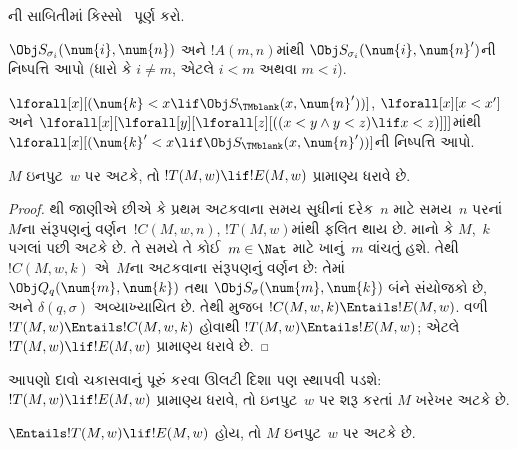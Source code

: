\begin{prob}
ની સાબિતીમાં
કિસ્સો~ પૂર્ણ કરો.
\end{prob}

\begin{prob}
$\Obj S_{\sigma_i}(\num{i}, \num{n})$ અને
$!A(m, n)$માંથી
$\Obj S_{\sigma_i}(\num{i}, \num{n}')$ની
નિષ્પત્તિ આપો (ધારો કે $i \neq m$,
એટલે $i < m$ અથવા $m < i$).
\end{prob}

\begin{prob}
$\lforall[x][(\num{k} < x \lif \Obj
  S_\TMblank(x, \num{n}'))]$,
$\lforall[x][x < x']$ અને
$\lforall[x][\lforall[y][\lforall[z][ ((x < y \land y < z) \lif x <
      z)]]]$માંથી
$\lforall[x][(\num{k}' < x \lif \Obj
  S_\TMblank(x, \num{n}'))]$ની
નિષ્પત્તિ આપો.
\end{prob}

\begin{lem}
$M$ ઇનપુટ~$w$ પર અટકે, તો
$!T(M, w) \lif !E(M, w)$ પ્રામાણ્ય ધરાવે છે.
\end{lem}

\begin{proof}
થી જાણીએ છીએ કે પ્રથમ
અટકવાના સમય સુધીનાં દરેક~$n$ માટે
સમય~$n$ પરનાં~$M$ના સંરૂપણનું
વર્ણન~$!C(M, w, n)$,
$!T(M, w)$માંથી ફલિત થાય છે.
માનો કે $M$,~$k$ પગલાં પછી અટકે છે. તે સમયે
તે કોઈ~$m \in \Nat$ માટે ખાનું~$m$ વાંચતું હશે.
તેથી $!C(M, w, k)$ એ~$M$ના અટકવાના
સંરૂપણનું વર્ણન છે: તેમાં
$\Obj Q_q(\num{m}, \num{k})$ તથા
$\Obj S_\sigma(\num{m}, \num{k})$ બંને સંયોજકો છે,
અને $\delta(q,\sigma)$ અવ્યાખ્યાયિત છે. તેથી
 મુજબ
$!C(M, w, k) \Entails !E(M, w)$. વળી
$!T(M, w) \Entails !C(M, w, k)$ હોવાથી
$!T(M, w) \Entails !E(M, w)$; એટલે
$!T(M, w) \lif !E(M, w)$ પ્રામાણ્ય ધરાવે છે.
\end{proof}

\begin{explain}
આપણો દાવો ચકાસવાનું પૂરું કરવા ઊલટી દિશા પણ
સ્થાપવી પડશે: $!T(M, w) \lif !E(M, w)$
પ્રામાણ્ય ધરાવે, તો ઇનપુટ~$w$ પર શરૂ કરતાં
$M$ ખરેખર અટકે છે.
\end{explain}

\begin{lem}
$\Entails !T(M, w) \lif !E(M, w)$ હોય, તો
$M$ ઇનપુટ~$w$ પર અટકે છે.
\end{lem}

